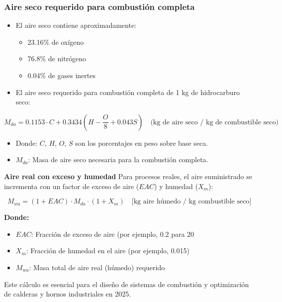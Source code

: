 \documentclass[../../main.tex]{subfiles}
\begin{document}
\begin{frame}
\frametitle{Aire seco requerido para combustión completa}

\begin{itemize}
    \item El aire seco contiene aproximadamente:
    \begin{itemize}
        \item 23.16\% de oxígeno
        \item 76.8\% de nitrógeno
        \item 0.04\% de gases inertes
    \end{itemize}
    
    \item El aire seco requerido para combustión completa de 1 kg de hidrocarburo seco:
\end{itemize}
\[
M_{da} = 0.1153 \cdot C + 0.3434 ( H - \frac{O}{8} + 0.043  S)
\quad \text{(kg de aire seco / kg de combustible seco)}
\]

\begin{itemize}
    \item Donde: $C$, $H$, $O$, $S$ son los porcentajes en peso sobre base seca.
    \item \(M_{da}\): Masa de aire seco necesaria para la combustión completa.
\end{itemize}

\end{frame}


\begin{frame}{\textbf{Aire real con exceso y humedad}}
\justifying
Para procesos reales, el aire suministrado se incrementa con un factor de exceso de aire (\(EAC\)) y humedad (\(X_m\)):

\vspace{1em}
\[
M_{wa} = (1 + EAC) \cdot M_{da} \cdot (1 + X_m)
\quad \text{[kg aire húmedo / kg combustible seco]}
\]

\vspace{1em}
\textbf{Donde:}
\begin{itemize}
  \item \(EAC\): Fracción de exceso de aire (por ejemplo, 0.2 para 20 %
  \item \(X_m\): Fracción de humedad en el aire (por ejemplo, 0.015)
  \item \(M_{wa}\): Masa total de aire real (húmedo) requerido
\end{itemize}

\vspace{0.5em}
Este cálculo es esencial para el diseño de sistemas de combustión y optimización de calderas y hornos industriales en 2025.
\end{frame}
\end{document}
